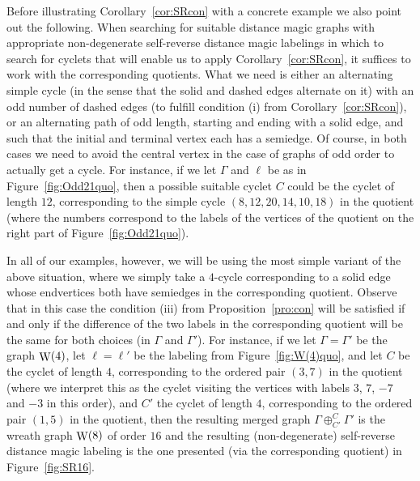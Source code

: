 \documentclass[11 pt,english]{article}
\newcommand{\G}{\Gamma}
\newcommand{\Wr}{\mathop{\rm W}}
\theoremstyle{definition}
\begin{document}
Before illustrating Corollary~\ref{cor:SRcon} with a concrete example we also point out the following. When searching for suitable distance magic graphs with appropriate non-degenerate self-reverse distance magic labelings in which to search for cyclets that will enable us to apply Corollary~\ref{cor:SRcon}, it suffices to work with the corresponding quotients. What we need is either an alternating simple cycle (in the sense that the solid and dashed edges alternate on it) with an odd number of dashed edges (to fulfill condition (i) from Corollary~\ref{cor:SRcon}), or an alternating path of odd length, starting and ending with a solid edge, and such that the initial and terminal vertex each has a semiedge. Of course, in both cases we need to avoid the central vertex in the case of graphs of odd order to actually get a cycle. For instance, if we let $\G$ and $\ell$ be as in Figure~\ref{fig:Odd21quo}, then a possible suitable cyclet $C$ could be the cyclet of length $12$, corresponding to the simple cycle $(8,12,20,14,10,18)$ in the quotient (where the numbers correspond to the labels of the vertices of the quotient on the right part of Figure~\ref{fig:Odd21quo}). 

In all of our examples, however, we will be using the most simple variant of the above situation, where we simply take a $4$-cycle corresponding to a solid edge whose endvertices both have semiedges in the corresponding quotient. Observe that in this case the condition (iii) from Proposition~\ref{pro:con} will be satisfied if and only if the  difference of the two labels in the corresponding quotient will be the same for both choices (in $\G$ and $\G'$). For instance, if we let $\G = \G'$ be the graph $\Wr(4)$, let $\ell = \ell'$ be the labeling from Figure~\ref{fig:W(4)quo}, and let $C$ be the cyclet of length $4$, corresponding to the ordered pair $(3,7)$ in the quotient (where we interpret this as the cyclet visiting the vertices with labels $3$, $7$, $-7$ and $-3$ in this order), and $C'$ the cyclet of length $4$, corresponding to the ordered pair $(1,5)$ in the quotient, then the resulting merged graph $\G\oplus^{C}_{C'} \G'$ is the wreath graph $\Wr(8)$ of order $16$ and the resulting (non-degenerate) self-reverse distance magic labeling is the one presented (via the corresponding quotient) in Figure~\ref{fig:SR16}. 
\end{document}
